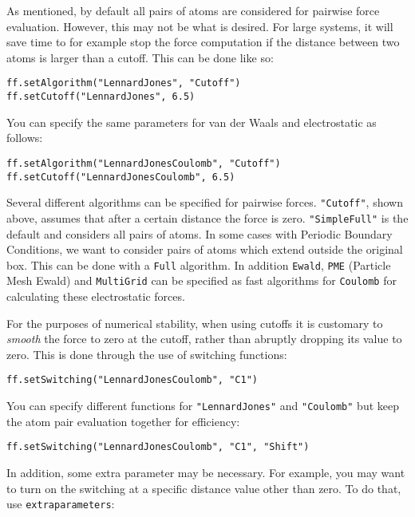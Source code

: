 \documentclass[11pt]{report}
\begin{document}
As mentioned, by default all pairs of atoms are considered
for pairwise force evaluation.  However, this may not be 
what is desired.  For large systems, it will save time
to for example stop the force computation if the 
distance between two atoms is larger than a cutoff.
This can be done like so:

\begin{verbatim}
ff.setAlgorithm("LennardJones", "Cutoff")
ff.setCutoff("LennardJones", 6.5)
\end{verbatim}

You can specify the same parameters for
van der Waals and electrostatic as follows:

\begin{verbatim}
ff.setAlgorithm("LennardJonesCoulomb", "Cutoff")
ff.setCutoff("LennardJonesCoulomb", 6.5)
\end{verbatim}

Several different algorithms can be specified
for pairwise forces. \texttt{"Cutoff"}, shown
above, assumes that after a certain distance
the force is zero.  \texttt{"SimpleFull"} is the
default and considers all pairs of atoms. In some
cases with Periodic Boundary Conditions, we want to
consider pairs of atoms which extend outside the original
box.  This can be done with a \texttt{Full} algorithm.
In addition \texttt{Ewald}, \texttt{PME} (Particle Mesh
Ewald) and \texttt{MultiGrid} can be specified
as fast algorithms for \texttt{Coulomb} for calculating
these electrostatic forces.

For the purposes of numerical stability, when
using cutoffs it is customary to {\it smooth} the
force to zero at the cutoff, rather than abruptly
dropping its value to zero.  This is done through
the use of switching functions:

\begin{verbatim}
ff.setSwitching("LennardJonesCoulomb", "C1")
\end{verbatim}

You can specify different functions for 
\texttt{"LennardJones"} and \texttt{"Coulomb"} but
keep the atom pair evaluation together for efficiency:

\begin{verbatim}
ff.setSwitching("LennardJonesCoulomb", "C1", "Shift")
\end{verbatim}

In addition, some extra parameter may be necessary.
For example, you may want to turn on the switching
at a specific distance value other than zero.  
To do that, use \texttt{extraparameters}:
\end{document}
